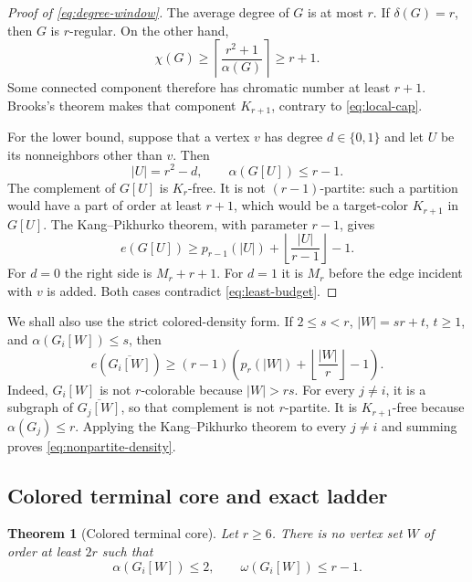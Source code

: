 \documentclass[11pt,reqno,a4paper]{amsart}
\newtheorem{theorem}{Theorem}[section]
\theoremstyle{definition}
\theoremstyle{remark}
\newcommand{\comp}[1]{\overline{#1}}
\begin{document}
\begin{proof}[Proof of \eqref{eq:degree-window}]
The average degree of $G$ is at most $r$. If $\delta(G)=r$, then $G$ is
$r$-regular. On the other hand,
\[
  \chi(G)\geq
  \left\lceil\frac{r^2+1}{\alpha(G)}\right\rceil\geq r+1.
\]
Some connected component therefore has chromatic number at least $r+1$.
Brooks's theorem makes that component $K_{r+1}$, contrary to
\eqref{eq:local-cap}.

For the lower bound, suppose that a vertex $v$ has degree
$d\in\{0,1\}$ and let $U$ be its nonneighbors other than $v$. Then
\[
  |U|=r^2-d,
  \qquad \alpha(G[U])\leq r-1.
\]
The complement of $G[U]$ is $K_r$-free. It is not $(r-1)$-partite:
such a partition would have a part of order at least $r+1$, which would
be a target-color $K_{r+1}$ in $G[U]$. The Kang--Pikhurko theorem, with
parameter $r-1$, gives
\[
 e(G[U])\geq
 p_{r-1}(|U|)+\left\lfloor\frac{|U|}{r-1}\right\rfloor-1.
\]
For $d=0$ the right side is $M_r+r+1$. For $d=1$ it is $M_r$ before
the edge incident with $v$ is added. Both cases contradict
\eqref{eq:least-budget}.
\end{proof}

We shall also use the strict colored-density form. If
$2\leq s<r$, $|W|=sr+t$, $t\geq1$, and
$\alpha(G_i[W])\leq s$, then
\begin{equation}\label{eq:nonpartite-density}
 e\!\left(\comp{G_i[W]}\right)
 \geq (r-1)\left(
 p_r(|W|)+\left\lfloor\frac{|W|}{r}\right\rfloor-1\right).
\end{equation}
Indeed, $G_i[W]$ is not $r$-colorable because $|W|>rs$. For every
$j\ne i$, it is a subgraph of $\comp{G_j[W]}$, so that complement is
not $r$-partite. It is $K_{r+1}$-free because $\alpha(G_j)\leq r$.
Applying the Kang--Pikhurko theorem to every $j\ne i$ and summing proves
\eqref{eq:nonpartite-density}.

\subsection{Colored terminal core and exact ladder}

\begin{theorem}[Colored terminal core]\label{thm:terminal-core}
Let $r\geq6$. There is no vertex set $W$ of order at least $2r$ such
that
\[
  \alpha(G_i[W])\leq2,
  \qquad \omega(G_i[W])\leq r-1.
\]
\end{theorem}
\end{document}
